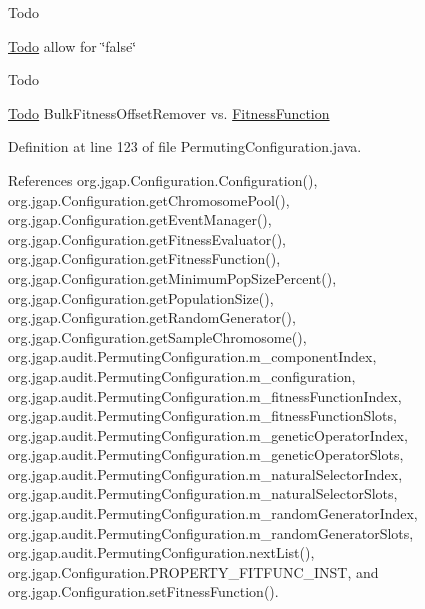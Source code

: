 \begin{DoxyRefDesc}{Todo}
\item[\hyperlink{todo__todo000037}{Todo}]allow for \char`\"{}false\char`\"{} \end{DoxyRefDesc}


\begin{DoxyRefDesc}{Todo}
\item[\hyperlink{todo__todo000038}{Todo}]Bulk\-Fitness\-Offset\-Remover vs. \hyperlink{classorg_1_1jgap_1_1_fitness_function}{Fitness\-Function} \end{DoxyRefDesc}


Definition at line 123 of file Permuting\-Configuration.\-java.



References org.\-jgap.\-Configuration.\-Configuration(), org.\-jgap.\-Configuration.\-get\-Chromosome\-Pool(), org.\-jgap.\-Configuration.\-get\-Event\-Manager(), org.\-jgap.\-Configuration.\-get\-Fitness\-Evaluator(), org.\-jgap.\-Configuration.\-get\-Fitness\-Function(), org.\-jgap.\-Configuration.\-get\-Minimum\-Pop\-Size\-Percent(), org.\-jgap.\-Configuration.\-get\-Population\-Size(), org.\-jgap.\-Configuration.\-get\-Random\-Generator(), org.\-jgap.\-Configuration.\-get\-Sample\-Chromosome(), org.\-jgap.\-audit.\-Permuting\-Configuration.\-m\-\_\-component\-Index, org.\-jgap.\-audit.\-Permuting\-Configuration.\-m\-\_\-configuration, org.\-jgap.\-audit.\-Permuting\-Configuration.\-m\-\_\-fitness\-Function\-Index, org.\-jgap.\-audit.\-Permuting\-Configuration.\-m\-\_\-fitness\-Function\-Slots, org.\-jgap.\-audit.\-Permuting\-Configuration.\-m\-\_\-genetic\-Operator\-Index, org.\-jgap.\-audit.\-Permuting\-Configuration.\-m\-\_\-genetic\-Operator\-Slots, org.\-jgap.\-audit.\-Permuting\-Configuration.\-m\-\_\-natural\-Selector\-Index, org.\-jgap.\-audit.\-Permuting\-Configuration.\-m\-\_\-natural\-Selector\-Slots, org.\-jgap.\-audit.\-Permuting\-Configuration.\-m\-\_\-random\-Generator\-Index, org.\-jgap.\-audit.\-Permuting\-Configuration.\-m\-\_\-random\-Generator\-Slots, org.\-jgap.\-audit.\-Permuting\-Configuration.\-next\-List(), org.\-jgap.\-Configuration.\-P\-R\-O\-P\-E\-R\-T\-Y\-\_\-\-F\-I\-T\-F\-U\-N\-C\-\_\-\-I\-N\-S\-T, and org.\-jgap.\-Configuration.\-set\-Fitness\-Function().



